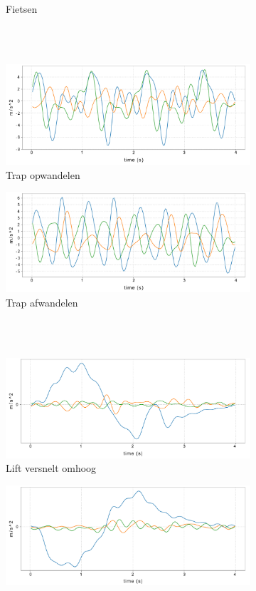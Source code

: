 \documentclass{article}
\begin{document}
\begin{figure}[hb!]
\begin{subfigure}[b]{.49\linewidth}
    \caption{Fietsen}\label{fig:1d}
  \end{subfigure} \\~\\
  \begin{subfigure}[b]{.49\linewidth}
    \centering
    \includegraphics[width=.70\textwidth]{figures/trapop}
    \caption{Trap opwandelen}\label{fig:1e}
  \end{subfigure} 
  \begin{subfigure}[b]{.49\linewidth}
    \centering 
    \includegraphics[width=.70\textwidth]{figures/trapaf}
    \caption{Trap afwandelen}\label{fig:1f}
  \end{subfigure} \\~\\
  \begin{subfigure}[b]{.49\linewidth}
    \centering
    \includegraphics[width=.70\textwidth]{figures/liftau}
    \caption{Lift versnelt omhoog}\label{fig:1g}
  \end{subfigure}
  \begin{subfigure}[b]{.49\linewidth}
    \centering
    \includegraphics[width=.70\textwidth]{figures/liftad}

\end{subfigure}
\end{figure}
\end{document}
